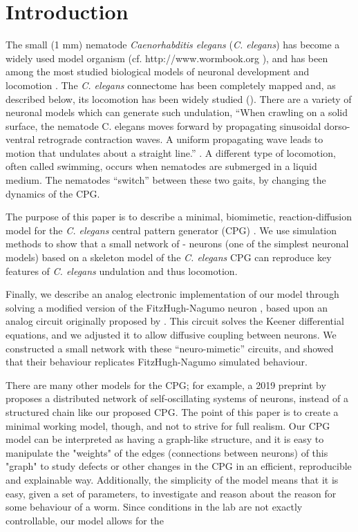 \documentclass[
    11pt,
]{article}
\begin{document}
\section{Introduction}\label{sec: intro}

The small (1 mm) nematode \emph{Caenorhabditis elegans} (\emph{C. elegans}) has become a widely used model organism (cf. http://www.wormbook.org \cite{corsi2015}), and has been among the most studied biological models of neuronal development and locomotion \citep{katz2016, corsi2015}.
The \emph{C. elegans} connectome has been completely mapped \citep{jabr} and, as described below, its locomotion has been widely studied (\citet{corsi2015, gjorgjieva2014, }).  There are a variety of neuronal models which can generate such undulation,
``When crawling on a solid surface, the nematode C. elegans moves forward by propagating sinusoidal dorso-ventral retrograde contraction waves.  A uniform propagating wave leads to motion that undulates about a straight line.'' \citep{kim2011}.
A different type of locomotion, often called swimming, occurs when nematodes are submerged in a liquid medium. The nematodes “switch” between these two gaits, by changing the dynamics of the CPG.

The purpose of this paper is to describe a minimal, biomimetic, reaction-diffusion model for the \emph{C. elegans} central pattern generator (CPG) \citep{xu2018, wen2012}.  We use simulation methods to show that a small network of \citet{fitzhugh1955}-\citet{nagumo1962} neurons (one of the simplest neuronal models) based on a skeleton model of the \emph{C. elegans} CPG can reproduce key features of \emph{C. elegans} undulation \citep{magnes2012} and thus locomotion.

Finally, we describe an analog electronic implementation of our model through solving a modified version of the FitzHugh-Nagumo neuron \cite{fitzhugh1955}, based upon an analog circuit originally proposed by \citet{keener1983}.  This circuit solves the Keener differential equations, and we adjusted it to allow diffusive coupling between neurons.  We constructed a small network with these ``neuro-mimetic'' circuits, and showed that their behaviour replicates FitzHugh-Nagumo simulated behaviour.

There are many other models for the CPG; for example, a 2019 preprint by \cite{olivares2019} proposes a distributed network of self-oscillating systems of neurons, instead of a structured chain like our proposed CPG.  The point of this paper is to create a minimal working model, though, and not to strive for full realism.  Our CPG model can be interpreted as having a graph-like structure, and it is easy to manipulate the "weights" of the edges (connections between neurons) of this "graph" to study defects or other changes in the CPG in an efficient, reproducible and explainable way.  Additionally, the simplicity of the model means that it is easy, given a set of parameters, to investigate and reason about the reason for some behaviour of a worm.  Since conditions in the lab are not exactly controllable, our model allows for the
\end{document}
